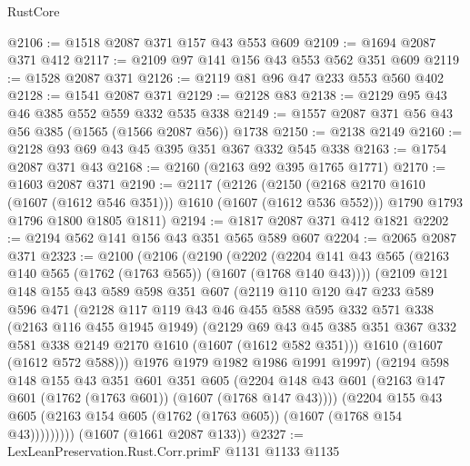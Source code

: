 \begin{lexlean}{RustCore}
\begin{coremodule}
@2106 := @1518 @2087 @371 @157 @43 @553 @609
@2109 := @1694 @2087 @371 @412
@2117 := @2109 @97 @141 @156 @43 @553 @562 @351 @609
@2119 := @1528 @2087 @371
@2126 := @2119 @81 @96 @47 @233 @553 @560 @402
@2128 := @1541 @2087 @371
@2129 := @2128 @83
@2138 := @2129 @95 @43 @46 @385 @552 @559 @332 @535 @338
@2149 := @1557 @2087 @371 @56 @43 @56 @385 (@1565 (@1566 @2087 @56)) @1738
@2150 := @2138 @2149
@2160 := @2128 @93 @69 @43 @45 @395 @351 @367 @332 @545 @338
@2163 := @1754 @2087 @371 @43
@2168 := @2160 (@2163 @92 @395 @1765 @1771)
@2170 := @1603 @2087 @371
@2190 := @2117
    (@2126
      (@2150 (@2168 @2170 @1610 (@1607 (@1612 @546 @351))) @1610 (@1607 (@1612 @536 @552)))
      @1790
      @1793
      @1796
      @1800
      @1805
      @1811)
@2194 := @1817 @2087 @371 @412 @1821
@2202 := @2194 @562 @141 @156 @43 @351 @565 @589 @607
@2204 := @2065 @2087 @371
@2323 := @2100
    (@2106
      (@2190
        (@2202
          (@2204 @141 @43 @565 (@2163 @140 @565 (@1762 (@1763 @565)) (@1607 (@1768 @140 @43))))
          (@2109
            @121
            @148
            @155
            @43
            @589
            @598
            @351
            @607
            (@2119
              @110
              @120
              @47
              @233
              @589
              @596
              @471
              (@2128
                @117
                @119
                @43
                @46
                @455
                @588
                @595
                @332
                @571
                @338
                (@2163 @116 @455 @1945 @1949)
                (@2129
                  @69
                  @43
                  @45
                  @385
                  @351
                  @367
                  @332
                  @581
                  @338
                  @2149
                  @2170
                  @1610
                  (@1607 (@1612 @582 @351)))
                @1610
                (@1607 (@1612 @572 @588)))
              @1976
              @1979
              @1982
              @1986
              @1991
              @1997)
            (@2194
              @598
              @148
              @155
              @43
              @351
              @601
              @351
              @605
              (@2204 @148 @43 @601 (@2163 @147 @601 (@1762 (@1763 @601)) (@1607 (@1768 @147 @43))))
              (@2204
                @155
                @43
                @605
                (@2163 @154 @605 (@1762 (@1763 @605)) (@1607 (@1768 @154 @43)))))))))
    (@1607 (@1661 @2087 @133))
@2327 := LexLeanPreservation.Rust.Corr.primF @1131 @1133 @1135

\end{coremodule}
\end{lexlean}
